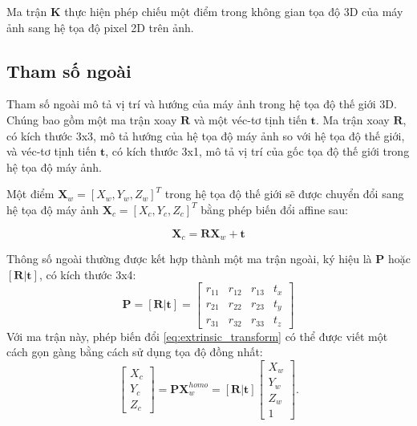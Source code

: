 Ma trận $\mathbf{K}$ thực hiện phép chiếu một điểm trong không gian tọa độ 3D của máy ảnh sang hệ tọa độ pixel 2D trên ảnh.

\subsection{Tham số ngoài}

Tham số ngoài mô tả vị trí và hướng của máy ảnh trong hệ tọa độ thế giới 3D. Chúng bao gồm một ma trận xoay $\mathbf{R}$ và một véc-tơ tịnh tiến $\mathbf{t}$. Ma trận xoay $\mathbf{R}$, có kích thước 3x3, mô tả hướng của hệ tọa độ máy ảnh so với hệ tọa độ thế giới, và véc-tơ tịnh tiến $\mathbf{t}$, có kích thước 3x1, mô tả vị trí của gốc tọa độ thế giới trong hệ tọa độ máy ảnh. 

Một điểm $\mathbf{X}_w = [X_w, Y_w, Z_w]^T$ trong hệ tọa độ thế giới sẽ được chuyển đổi sang hệ tọa độ máy ảnh $\mathbf{X}_c = [X_c, Y_c, Z_c]^T$ bằng phép biến đổi affine sau:

\begin{equation}\label{eq:extrinsic_transform}
    \mathbf{X}_c = \mathbf{R} \mathbf{X}_w + \mathbf{t}
\end{equation}

Thông số ngoài thường được kết hợp thành một ma trận ngoài, ký hiệu là $\mathbf{P}$ hoặc $[\mathbf{R}|\mathbf{t}]$, có kích thước 3x4:
\begin{equation} \label{eq:extrinsic_matrix}
\mathbf{P} = [\mathbf{R} | \mathbf{t}] = 
\begin{bmatrix}
r_{11} & r_{12} & r_{13} & t_x \\
r_{21} & r_{22} & r_{23} & t_y \\
r_{31} & r_{32} & r_{33} & t_z
\end{bmatrix}
\end{equation}
Với ma trận này, phép biến đổi \eqref{eq:extrinsic_transform} có thể được viết một cách gọn gàng bằng cách sử dụng tọa độ đồng nhất:
\begin{equation} \label{eq:extrinsic_transform_homogeneous}
\begin{bmatrix} X_c \\ Y_c \\ Z_c \end{bmatrix} 
= \mathbf{P} \mathbf{X}_w^{homo}
= [\mathbf{R} | \mathbf{t}] 
\begin{bmatrix} 
X_w \\ Y_w \\ Z_w \\ 1 
\end{bmatrix}.
\end{equation}


